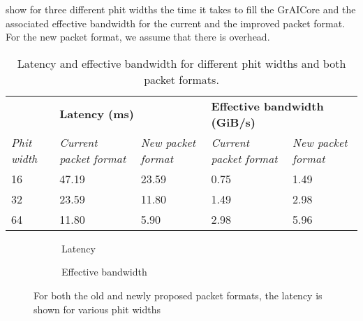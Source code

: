  show for three different phit widths the time it takes to fill the GrAICore and the associated effective bandwidth for the current and the improved packet format.
For the new packet format, we assume that there is overhead.

\begin{table}[hbtp]
\centering
\begin{adjustbox}{width=\linewidth}
\begin{tabular}{@{}lllll@{}}
\toprule
                    & \multicolumn{2}{l}{\textbf{Latency (ms)}} & \multicolumn{2}{l}{\textbf{Effective bandwidth (GiB/s)}} \\ \cmidrule(lr){2-3} \cmidrule(lr){4-5}
\textit{Phit width} & \textit{Current packet format}    & \textit{New packet format}   & \textit{Current packet format}    & \textit{New packet format}   \\ \midrule
16                  & 47.19                    & 23.59               & 0.75                     & 1.49                \\
32                  & 23.59                    & 11.80               & 1.49                     & 2.98                \\
64                  & 11.80                    & 5.90                & 2.98                     & 5.96                \\ \bottomrule
\end{tabular}
\end{adjustbox}
\caption{Latency and effective bandwidth for different phit widths and both packet formats.}
\label{tab:latency_bandwidth_phit_width_packet_format}
\end{table}

\begin{figure}[htbp]
    \centering
    \begin{subfigure}[b]{0.48\textwidth}
        \begin{adjustbox}{width=\linewidth}
            
        \end{adjustbox}
        \caption{Latency}
    \end{subfigure}
    \hfill
    \begin{subfigure}[b]{0.48\textwidth}
        \begin{adjustbox}{width=\linewidth}
            
        \end{adjustbox}
        \caption{Effective bandwidth}
    \end{subfigure}
    \caption[]{For both the old and newly proposed packet formats, the latency is shown for various phit widths}
    \label{fig:latency_bandwidth_phit_width_packet_format}
\end{figure}

